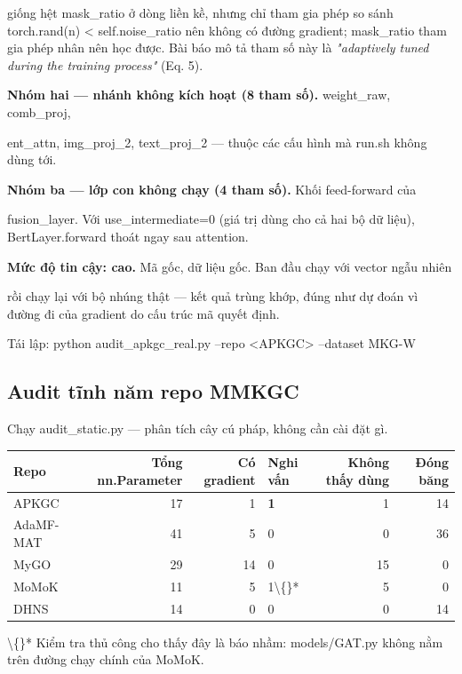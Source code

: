 \documentclass[11pt,a4paper]{article}
\newcommand{\code}[1]{{\ttfamily\small\color{codetext}#1}}
\begin{document}
giống hệt \code{mask\_ratio} ở dòng liền kề, nhưng chỉ tham gia phép so sánh \code{torch.rand(n) < self.noise\_ratio} nên không có đường gradient; \code{mask\_ratio} tham gia phép nhân nên học được. Bài báo mô tả tham số này là \emph{"adaptively tuned during the training process"} (Eq. 5).

\textbf{Nhóm hai --- nhánh không kích hoạt (8 tham số).} \code{weight\_raw}, \code{comb\_proj},

\code{ent\_attn}, \code{img\_proj\_2}, \code{text\_proj\_2} --- thuộc các cấu hình mà \code{run.sh} không dùng tới.

\textbf{Nhóm ba --- lớp con không chạy (4 tham số).} Khối feed-forward của

\code{fusion\_layer}. Với \code{use\_intermediate=0} (giá trị dùng cho cả hai bộ dữ liệu), \code{BertLayer.forward} thoát ngay sau attention.

\textbf{Mức độ tin cậy: cao.} Mã gốc, dữ liệu gốc. Ban đầu chạy với vector ngẫu nhiên

rồi chạy lại với bộ nhúng thật --- kết quả trùng khớp, đúng như dự đoán vì đường đi của gradient do cấu trúc mã quyết định.

Tái lập: \code{python audit\_apkgc\_real.py --repo <APKGC> --dataset MKG-W}

\subsection{Audit tĩnh năm repo MMKGC}
Chạy \code{audit\_static.py} --- phân tích cây cú pháp, không cần cài đặt gì.

\begin{center}\small
\begin{tabular}{@{}lrrlrr@{}}
\toprule
\textbf{Repo} & \textbf{Tổng \code{nn.Parameter}} & \textbf{Có gradient} & \textbf{Nghi vấn} & \textbf{Không thấy dùng} & \textbf{Đóng băng}\\
\midrule
APKGC & 17 & 1 & \textbf{1} & 1 & 14\\
AdaMF-MAT & 41 & 5 & 0 & 0 & 36\\
MyGO & 29 & 14 & 0 & 15 & 0\\
MoMoK & 11 & 5 & 1\textbackslash\{\}* & 5 & 0\\
DHNS & 14 & 0 & 0 & 0 & 14\\
\bottomrule
\end{tabular}
\end{center}
\textbackslash\{\}* Kiểm tra thủ công cho thấy đây là báo nhầm: \code{models/GAT.py} không nằm trên đường chạy chính của MoMoK.
\end{document}
